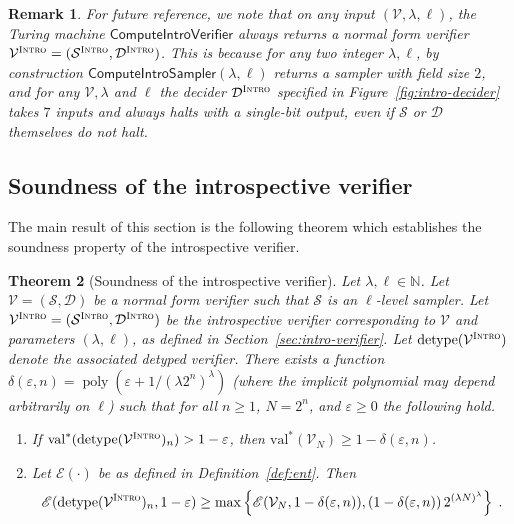 \documentclass[11pt]{article}
\newtheorem{theorem}{Theorem}[section]
\newtheorem{remark}[theorem]{Remark}
\theoremstyle{definition}
\newcommand{\N}{\ensuremath{\mathbb{N}}}
\DeclareMathOperator{\poly}{poly}
\newcommand{\val}{\ensuremath{\mathrm{val}}}
\newcommand{\eps}{\varepsilon}
\newcommand{\sampler}{\mathcal{S}}
\newcommand{\decider}{\mathcal{D}}
\newcommand{\verifier}{\mathcal{V}}
\newcommand{\detype}{\mathrm{detype}}
\newcommand{\gamestyle}[1]{\ensuremath{\textsc{#1}}\xspace}
\newcommand{\intro}{\gamestyle{Intro}}
\newcommand{\Ent}{\mathscr{E}}
\newcommand{\tmstyle}[1]{\ensuremath{\mathsf{#1}}}
\newcommand{\ComputeIntroSampler}{\tmstyle{ComputeIntroSampler}}
\newcommand{\ComputeIntroVerifier}{\tmstyle{ComputeIntroVerifier}}
\begin{document}
\begin{remark}\label{rk:intro-normalform}
  For future reference, we note that on any input $(\verifier, \lambda, \ell)$,
  the Turing machine $\ComputeIntroVerifier$ \emph{always} returns a normal form
  verifier $\verifier^\intro = (\sampler^\intro,\decider^\intro)$.
  This is because for any two integer $\lambda,\ell$, by construction
  $\ComputeIntroSampler(\lambda,\ell)$ returns a sampler with field size $2$,
  and for any $\verifier, \lambda$ and $\ell$ the decider $\decider^\intro$
  specified in Figure~\ref{fig:intro-decider} takes $7$ inputs and always halts
  with a single-bit output, even if $\sampler$ or $\decider$ themselves do not
  halt.
\end{remark}

\subsection{Soundness of the introspective verifier}

The main result of this section is the following theorem which establishes the
soundness property of the introspective verifier.

\begin{theorem}[Soundness of the introspective verifier]
  \label{thm:intro-game}
  Let $\lambda,\ell \in \N$.
  Let $\verifier = (\sampler, \decider)$ be a normal form verifier such that
  $\sampler$ is an $\ell$-level sampler.
  Let $\verifier^\intro = (\sampler^\intro, \decider^\intro)$ be the
  introspective verifier corresponding to $\verifier$ and parameters
  $(\lambda,\ell)$, as defined in Section~\ref{sec:intro-verifier}.
  Let $\detype(\verifier^\intro)$ denote the associated detyped verifier.
  There exists a function $\delta(\eps,n) = \poly(\eps+1/(\lambda 2^n)^\lambda)$
  (where the implicit polynomial may depend arbitrarily on $\ell$) such that for
  all $n\geq 1$, $N=2^n$, and $\eps\geq 0$ the following hold.

  \begin{enumerate}
	\item If $\val^*(\detype(\verifier^\intro)_n) > 1 - \eps$, then
    $\val^*(\verifier_N) \geq 1 - \delta(\eps,n)$.
  \item Let $\Ent(\cdot)$ be as defined in Definition~\ref{def:ent}. Then 
    \begin{equation*}
      \Ent(\detype(\verifier^\intro)_n, 1 - \eps) \geq \max
      \left \{ \Ent(\verifier_{N}, 1 - \delta(\eps,n)),
        (1 - \delta(\eps,n))\, 2^{(\lambda N)^\lambda} \right \}\;.
    \end{equation*}
  \end{enumerate}
\end{theorem}
\end{document}
